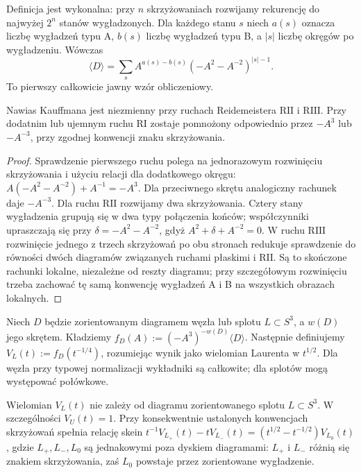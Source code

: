 Definicja jest wykonalna: przy $n$ skrzyżowaniach rozwijamy
rekurencję do najwyżej $2^n$ stanów wygładzonych. Dla każdego
stanu $s$ niech $a(s)$ oznacza liczbę wygładzeń typu A,
$b(s)$ liczbę wygładzeń typu B, a $|s|$ liczbę okręgów po
wygładzeniu. Wówczas
\[
\langle D\rangle=\sum_s A^{a(s)-b(s)}
(-A^2-A^{-2})^{|s|-1}.
\]
To pierwszy całkowicie jawny wzór obliczeniowy.

\begin{stwierdzenie}
Nawias Kauffmana jest niezmienny przy ruchach Reidemeistera
$\mathrm{R II}$ i $\mathrm{R III}$. Przy dodatnim lub ujemnym
ruchu $\mathrm{R I}$ zostaje pomnożony odpowiednio przez
$-A^3$ lub $-A^{-3}$, przy zgodnej konwencji znaku skrzyżowania.
\end{stwierdzenie}

\begin{proof}
Sprawdzenie pierwszego ruchu polega na jednorazowym rozwinięciu
skrzyżowania i użyciu relacji dla dodatkowego okręgu:
$A(-A^2-A^{-2})+A^{-1}=-A^3$.
Dla przeciwnego skrętu analogiczny rachunek daje $-A^{-3}$.
Dla ruchu $\mathrm{R II}$ rozwijamy dwa skrzyżowania. Cztery
stany wygładzenia grupują się w dwa typy połączenia końców;
współczynniki upraszczają się przy
$\delta=-A^2-A^{-2}$, gdyż $A^2+\delta+A^{-2}=0$.
W ruchu $\mathrm{R III}$ rozwinięcie jednego z trzech
skrzyżowań po obu stronach redukuje sprawdzenie do równości
dwóch diagramów związanych ruchami płaskimi i $\mathrm{R II}$.
Są to skończone rachunki lokalne, niezależne od reszty diagramu;
przy szczegółowym rozwinięciu trzeba zachować tę samą konwencję
wygładzeń A i B na wszystkich obrazach lokalnych.
\end{proof}

\begin{definicja}
Niech $D$ będzie zorientowanym diagramem węzła lub splotu
$L\subset S^3$, a $w(D)$ jego skrętem. Kładziemy
$f_D(A):=(-A^3)^{-w(D)}\langle D\rangle$.
Następnie definiujemy $V_L(t):=f_D(t^{-1/4})$,
rozumiejąc wynik jako wielomian Laurenta w $t^{1/2}$.
Dla węzła przy typowej normalizacji wykładniki są całkowite;
dla splotów mogą występować połówkowe.
\end{definicja}

\begin{twierdzenie}
Wielomian $V_L(t)$ nie zależy od diagramu zorientowanego
splotu $L\subset S^3$. W szczególności $V_U(t)=1$.
Przy konsekwentnie ustalonych konwencjach skrzyżowań spełnia
relację skein
$t^{-1}V_{L_+}(t)-tV_{L_-}(t)=
(t^{1/2}-t^{-1/2})V_{L_0}(t)$,
gdzie $L_+,L_-,L_0$ są jednakowymi poza dyskiem diagramami:
$L_+$ i $L_-$ różnią się znakiem skrzyżowania, zaś $L_0$
powstaje przez zorientowane wygładzenie.
\end{twierdzenie}

